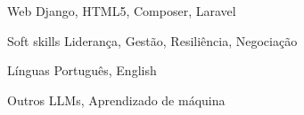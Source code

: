 \begin{cvskills}
\cvskill
{Web} %
{Django, HTML5, Composer, Laravel} %


\cvskill
{Soft skills} %
{Liderança, Gestão, Resiliência, Negociação} %


\cvskill
{Línguas} %
{Português, English} %


\cvskill
{Outros} %
{LLMs, Aprendizado de máquina} %

\end{cvskills}

